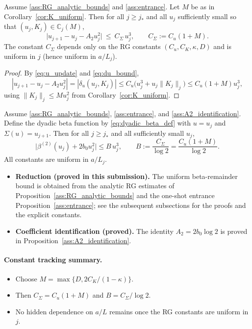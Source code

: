 \begin{theorem}\label{thm:step_remainder_RG}
Assume \ref{ass:RG_analytic_bounds} and \ref{ass:entrance}.
Let $M$ be as in Corollary~\ref{cor:K_uniform}. Then for all $j\ge j_\ast$ and all $u_j$ sufficiently small so that $(u_j,K_j)\in\mathbb C_j(M)$,
\begin{equation}\label{eq:step_remainder_bound}
\big|u_{j+1}-u_j-A_2 u_j^2\big|\ \le\ C_\Sigma\,u_j^3,
\qquad
C_\Sigma:=C_u(1+M).
\end{equation}
The constant $C_\Sigma$ depends only on the RG constants $(C_u,C_K,\kappa,D)$ and is uniform in $j$ (hence uniform in $a/L_j$).
\end{theorem}

\begin{proof}
By \eqref{eq:u_update} and \eqref{eq:du_bound},
\[
|u_{j+1}-u_j-A_2 u_j^2|=|\delta_u(u_j,K_j)|
\le C_u\big(u_j^3+u_j\|K_j\|_j\big)
\le C_u(1+M)u_j^3,
\]
using $\|K_j\|_j\le M u_j^2$ from Corollary~\ref{cor:K_uniform}.
\end{proof}

\begin{corollary}\label{cor:beta_remainder_RG}
Assume \ref{ass:RG_analytic_bounds}, \ref{ass:entrance}, and \ref{ass:A2_identification}.
Define the dyadic beta function by \eqref{eq:dyadic_beta_def} with $u=\!u_j$ and $\Sigma(u)=u_{j+1}$.
Then for all $j\ge j_\ast$ and all sufficiently small $u_j$,
\[
\big|\beta^{(2)}(u_j)+2b_0 u_j^2\big|
\le B\,u_j^3,
\qquad
B:=\frac{C_\Sigma}{\log 2}=\frac{C_u(1+M)}{\log 2}.
\]
All constants are uniform in $a/L_j$.
\end{corollary}

\begin{itemize}
\item \textbf{Reduction (proved in this submission).}
The uniform beta-remainder bound is obtained from the analytic RG estimates of Proposition~\ref{ass:RG_analytic_bounds}
and the one-shot entrance Proposition~\ref{ass:entrance}; see the subsequent subsections for the proofs and the explicit constants.
\item \textbf{Coefficient identification (proved).}
The identity $A_2=2b_0\log 2$ is proved in Proposition~\ref{ass:A2_identification}.
\end{itemize}

\paragraph{Constant tracking summary.}
\begin{itemize}
\item Choose $M=\max\{D,2C_K/(1-\kappa)\}$.
\item Then $C_\Sigma=C_u(1+M)$ and $B=C_\Sigma/\log2$.
\item No hidden dependence on $a/L$ remains once the RG constants are uniform in $j$.
\end{itemize}
